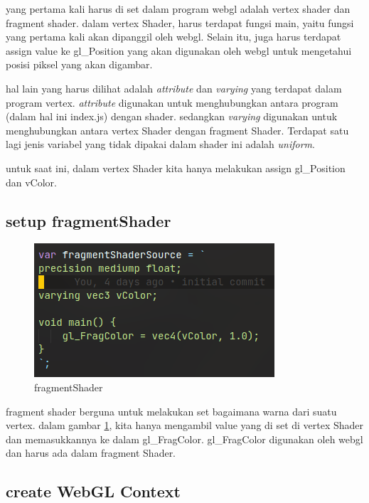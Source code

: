 yang pertama kali harus di set dalam program webgl adalah vertex shader dan fragment shader.
dalam vertex Shader, harus terdapat fungsi main, yaitu fungsi yang pertama kali akan dipanggil
oleh webgl. Selain itu, juga harus terdapat assign value ke gl\_Position yang akan digunakan oleh
webgl untuk mengetahui posisi piksel yang akan digambar.

hal lain yang harus dilihat adalah \emph{attribute} dan \emph{varying} yang terdapat dalam program vertex.
\emph{attribute} digunakan untuk menghubungkan antara program (dalam hal ini index.js) dengan shader. sedangkan
\emph{varying} digunakan untuk menghubungkan antara vertex Shader dengan fragment Shader. Terdapat satu lagi jenis variabel
yang tidak dipakai dalam shader ini adalah \emph{uniform}.

untuk saat ini, dalam vertex Shader kita hanya melakukan assign gl\_Position dan vColor.

\subsection{setup fragmentShader}

\begin{figure}[h]
    \centering
    \includegraphics{grafika/fragment shader.png}
    \caption{fragmentShader}
    \label{fig: fragmentShader}
\end{figure}

fragment shader berguna untuk melakukan set bagaimana warna dari suatu vertex.
dalam gambar \ref{fig: fragmentShader}, kita hanya mengambil value yang di set di vertex Shader dan memasukkannya ke dalam gl\_FragColor.
gl\_FragColor digunakan oleh webgl dan harus ada dalam fragment Shader.

\subsection{create WebGL Context}


